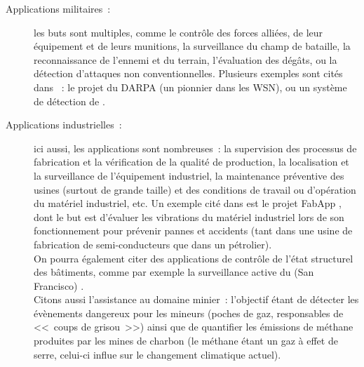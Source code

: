 \begin{description}

\item[Applications militaires~:] les buts sont multiples, comme le contrôle
des forces alliées, de leur équipement et de leurs munitions, la surveillance
du champ de bataille, la reconnaissance de l'ennemi et du terrain,
l'évaluation des dégâts, ou la détection d'attaques non conventionnelles.
Plusieurs exemples sont cités dans \cite{LivreAkyildiz2010}~: le projet
 du DARPA (un pionnier dans les WSN), ou un système de
détection de  \footnotemark[2].

\item[Applications industrielles~:] ici aussi, les applications sont
nombreuses~: la supervision des processus de fabrication et la vérification
de la qualité de production, la localisation et la surveillance de
l'équipement industriel, la maintenance préventive des usines (surtout de
grande taille) et des conditions de travail ou d'opération du matériel
industriel, etc. Un exemple cité dans \cite{LivreAkyildiz2010} est
le projet FabApp \cite{FabApp}, dont le but est d'évaluer les vibrations
du matériel industriel lors de son fonctionnement pour prévenir
pannes et accidents (tant dans une usine de fabrication de semi-conducteurs
que dans un pétrolier).\\
On pourra également citer des applications de contrôle de l'état structurel
des bâtiments, comme par exemple la surveillance active du  (San Francisco) \cite{AppGoldenGate}.\\
Citons aussi l'assistance au domaine minier~: l'objectif étant de détecter
les évènements dangereux pour les mineurs (poches de gaz, responsables
de <<~coups de grisou~>>) ainsi que de quantifier les émissions de méthane
produites par les mines de charbon (le méthane étant un gaz à effet de
serre, celui-ci influe sur le changement climatique actuel).


\end{description}
